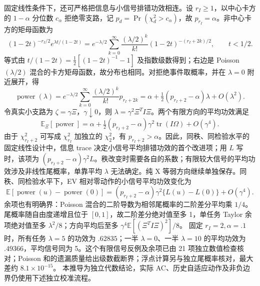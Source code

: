 \documentclass[UTF8,fontset=fandol,11pt,a4paper]{ctexart}
\begin{document}
固定线性条件下，还可严格把信息与小信号排错功效相连。设 $r_I\ge1$，以中心卡方的 $1-\alpha$ 分位数 $c_\alpha$ 拒绝零支路，记 $p_d=\Pr(\chi_d^2>c_\alpha)$，故 $p_{r_I}=\alpha$。非中心卡方的矩母函数为
\begin{equation}
 (1-2t)^{-r_I/2}e^{\lambda t/(1-2t)}
 =e^{-\lambda/2}\sum_{k=0}^{\infty}\frac{(\lambda/2)^k}{k!}
 (1-2t)^{-(r_I+2k)/2},\qquad t<1/2.
 \label{si:power-mixture}
\end{equation}
等式由 $t/(1-2t)=\tfrac12[(1-2t)^{-1}-1]$ 及指数级数得到；右边是 Poisson$(\lambda/2)$ 混合的卡方矩母函数，故分布也相同。对拒绝事件取概率，并在 $\lambda=0$ 附近展开，得
\begin{equation}
 \operatorname{power}(\lambda)
 =e^{-\lambda/2}\sum_{k=0}^{\infty}\frac{(\lambda/2)^k}{k!}p_{r_I+2k}
 =\alpha+\tfrac12(p_{r_I+2}-\alpha)\lambda+O(\lambda^2).
 \label{si:power-local}
\end{equation}
令真实小支路为 $\zeta=\gamma\Xi$，$\gamma\downarrow0$，则 $\lambda=\gamma^2\Xi^TI\Xi$。两个有限方向的平均功效满足
\begin{equation}
 \mathbb E_{\Xi}[\operatorname{power}]
 =\alpha+\tfrac12(p_{r_I+2}-\alpha)\gamma^2\operatorname{tr}(I\Omega)
 +O(\gamma^4).
 \label{si:average-power}
\end{equation}
由于 $\chi_{r_I+2}^2$ 可写成 $\chi_{r_I}^2$ 加独立的 $\chi_2^2$，有 $p_{r_I+2}>\alpha$。因此，同秩、同检验水平的固定线性设计中，信息 trace 决定小信号平均排错功效的首个改进项；用 $L$ 写时，该项为 $(p_{r_I+2}-\alpha)\gamma^2L$。秩改变时需要各自的系数；有限较大信号的平均功效涉及非线性尾概率，单靠平均 $\lambda$ 无法确定。纯 X 等弱方向继续单独保存。同秩、同检验水平下，EV 相对零动作的小信号平均功效变化为
\begin{equation}
 \mathbb E[\operatorname{power}(u)-\operatorname{power}(0)]
 =(p_{r_I+2}-\alpha)\gamma^2\{L(u)-L(0)\}+O(\gamma^4).
 \label{si:power-increment}
\end{equation}
余项也有明确界：Poisson 混合的二阶导数为相邻尾概率的二阶差分平均乘 $1/4$。尾概率随自由度递增且位于 $[0,1]$，故二阶差分绝对值至多 1，单任务 Taylor 余项绝对值至多 $\lambda^2/8$；方向平均后至多 $\gamma^4\mathbb E[(\Xi^TI\Xi)^2]/8$。
固定 $r_I=2,\alpha=.1$ 时，所有任务 $\lambda=5$ 的功效为 $.62835$；一半 $\lambda=0$、一半 $\lambda=10$ 的平均功效为 $.49366$，平均信号同为 5。这个有限信号反例及余项已由 21 项独立数值检查核对；Poisson 和的遗漏质量给出级数截断界；浮点计算另与独立尾概率核对，最大差约 $8.1\times10^{-15}$。
本推导为独立代数结论，实际 AC、历史自适应动作及非负边界仍使用下述独立校准流程。
\end{document}
